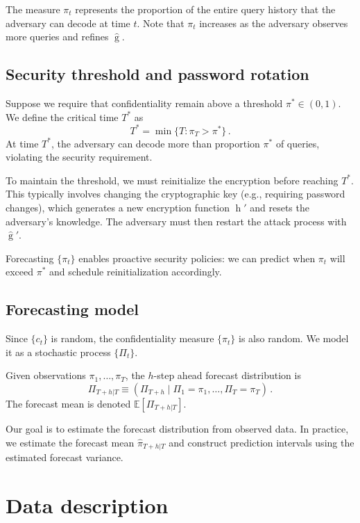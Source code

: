 \documentclass[final,11pt]{article}
\theoremstyle{plain}
\theoremstyle{remark}
\begin{document}
The measure $\pi_t$ represents the proportion of the entire query history
that the adversary can decode at time $t$. Note that $\pi_t$ increases as
the adversary observes more queries and refines $\hat{\operatorname{g}}$.

\subsection{Security threshold and password rotation}

Suppose we require that confidentiality remain above a threshold $\pi^* \in (0,1)$.
We define the critical time $T^*$ as
\begin{equation}
  T^* = \min\{T : \pi_T > \pi^*\}\,.
\end{equation}
At time $T^*$, the adversary can decode more than proportion $\pi^*$ of
queries, violating the security requirement.

To maintain the threshold, we must reinitialize the encryption before
reaching $T^*$. This typically involves changing the cryptographic key
(e.g., requiring password changes), which generates a new encryption
function $\operatorname{h}'$ and resets the adversary's knowledge.
The adversary must then restart the attack process with
$\hat{\operatorname{g}}'$.

Forecasting $\{\pi_t\}$ enables proactive security policies: we can
predict when $\pi_t$ will exceed $\pi^*$ and schedule reinitialization
accordingly.

\hypertarget{forecasting-model}{%
\subsection{Forecasting model}\label{forecasting-model}}

Since $\{c_t\}$ is random, the confidentiality measure $\{\pi_t\}$ is
also random. We model it as a stochastic process $\{\Pi_t\}$.

Given observations $\pi_1,\ldots,\pi_T$, the $h$-step ahead forecast
distribution is
$$
\Pi_{T+h|T} \equiv (\Pi_{T+h} \mid \Pi_1 = \pi_1,\ldots,\Pi_T = \pi_T)\,.
$$
The forecast mean is denoted $\mathbb{E}[\Pi_{T+h|T}]$.

Our goal is to estimate the forecast distribution from observed data. In
practice, we estimate the forecast mean $\hat{\pi}_{T+h|T}$ and construct
prediction intervals using the estimated forecast variance.

\hypertarget{data-description}{%
\section{Data description}\label{data-description}}
\end{document}
